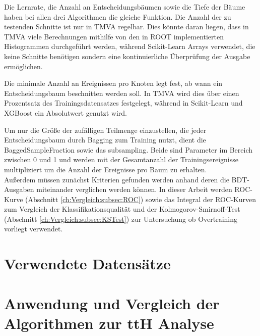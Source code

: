 Die Lernrate, die Anzahl an Entscheidungsbäumen sowie die Tiefe der Bäume haben bei allen drei Algorithmen die gleiche Funktion. Die Anzahl der zu testenden Schnitte ist nur in TMVA regelbar. Dies könnte daran liegen, dass in TMVA viele Berechnungen mithilfe von den in ROOT implementierten Histogrammen durchgeführt werden, während Scikit-Learn Arrays verwendet, die keine Schnitte benötigen sondern eine kontinuierliche Überprüfung der Ausgabe ermöglichen. 

Die minimale Anzahl an Ereignissen pro Knoten legt fest, ab wann ein Entscheidungsbaum beschnitten werden soll. In TMVA wird dies über einen Prozentsatz des Trainingsdatensatzes festgelegt, während in Scikit-Learn und XGBoost ein Absolutwert genutzt wird.

Um nur die Größe der zufälligen Teilmenge einzustellen, die jeder Entscheidungsbaum durch Bagging zum Training nutzt, dient die BaggedSampleFraction sowie das subsampling. Beide sind Parameter im Bereich zwischen 0 und 1 und werden mit der Gesamtanzahl der Trainingsereignisse multipliziert um die Anzahl der Ereignisse pro Baum zu erhalten.\\

Außerdem müssen zunächst Kriterien gefunden werden anhand deren die BDT-Ausgaben miteinander verglichen werden können. In dieser Arbeit werden ROC-Kurve (Abschnitt \ref{ch:Vergleich:subsec:ROC}) sowie das Integral der ROC-Kurven zum Vergleich der Klassifikationsqualität und der Kolmogorov-Smirnoff-Test (Abschnitt \ref{ch:Vergleich:subsec:KSTest}) zur Untersuchung ob Overtraining vorliegt verwendet.

\section{Verwendete Datens\"atze}
\label{ch:Vergleich:sec:Daten}

\section{Anwendung und Vergleich der Algorithmen zur ttH Analyse}
\label{ch:Vergleich:sec:ttH}
